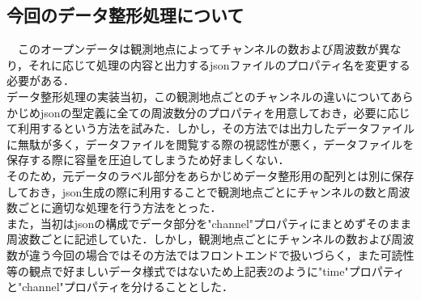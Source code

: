 \subsection{今回のデータ整形処理について}
　このオープンデータは観測地点によってチャンネルの数および周波数が異なり，それに応じて処理の内容と出力するjsonファイルのプロパティ名を変更する必要がある．\\
 データ整形処理の実装当初，この観測地点ごとのチャンネルの違いについてあらかじめjsonの型定義に全ての周波数分のプロパティを用意しておき，必要に応じて利用するという方法を試みた．しかし，その方法では出力したデータファイルに無駄が多く，データファイルを閲覧する際の視認性が悪く，データファイルを保存する際に容量を圧迫してしまうため好ましくない．\\
 そのため，元データのラベル部分をあらかじめデータ整形用の配列とは別に保存しておき，json生成の際に利用することで観測地点ごとにチャンネルの数と周波数ごとに適切な処理を行う方法をとった．\\
 また，当初はjsonの構成でデータ部分を"channel"プロパティにまとめずそのまま周波数ごとに記述していた．しかし，観測地点ごとにチャンネルの数および周波数が違う今回の場合ではその方法ではフロントエンドで扱いづらく，また可読性等の観点で好ましいデータ様式ではないため上記表2のように"time"プロパティと"channel"プロパティを分けることとした．\\

